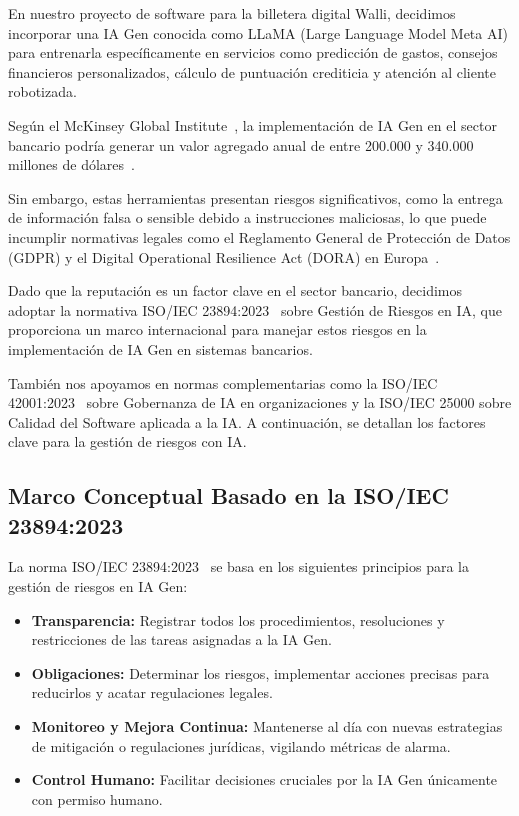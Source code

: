 \documentclass[12pt]{article}
\begin{document}
En nuestro proyecto de software para la billetera digital Walli, decidimos incorporar una IA Gen conocida como LLaMA 
(Large Language Model Meta AI) para entrenarla específicamente en servicios como predicción de gastos, 
consejos financieros personalizados, cálculo de puntuación crediticia y atención al cliente robotizada. 

Según el McKinsey Global Institute~\cite{mckinsey}, la implementación de IA Gen en el sector bancario 
podría generar un valor agregado anual de entre 200.000 y 340.000 millones de dólares~\cite{sheth2022}. 

Sin embargo, estas herramientas presentan riesgos significativos, como la entrega de información falsa 
o sensible debido a instrucciones maliciosas, lo que puede incumplir normativas legales como el 
Reglamento General de Protección de Datos (GDPR) y el Digital Operational Resilience Act (DORA) 
en Europa~\cite{botunac2024}.

Dado que la reputación es un factor clave en el sector bancario, decidimos adoptar la normativa 
ISO/IEC 23894:2023~\cite{iso23894} sobre Gestión de Riesgos en IA, que proporciona un marco internacional 
para manejar estos riesgos en la implementación de IA Gen en sistemas bancarios. 

También nos apoyamos en normas complementarias como la ISO/IEC 42001:2023~\cite{intedya} sobre 
Gobernanza de IA en organizaciones y la ISO/IEC 25000 sobre Calidad del Software aplicada a la IA. 
A continuación, se detallan los factores clave para la gestión de riesgos con IA.

\subsection{Marco Conceptual Basado en la ISO/IEC 23894:2023}
La norma ISO/IEC 23894:2023~\cite{iso23894} se basa en los siguientes principios para la gestión de riesgos en IA Gen:
\begin{itemize}
    \item \textbf{Transparencia:} Registrar todos los procedimientos, resoluciones y restricciones de las tareas asignadas a la IA Gen.
    \item \textbf{Obligaciones:} Determinar los riesgos, implementar acciones precisas para reducirlos y acatar regulaciones legales.
    \item \textbf{Monitoreo y Mejora Continua:} Mantenerse al día con nuevas estrategias de mitigación o regulaciones jurídicas, vigilando métricas de alarma.
    \item \textbf{Control Humano:} Facilitar decisiones cruciales por la IA Gen únicamente con permiso humano.
\end{itemize}
\end{document}
